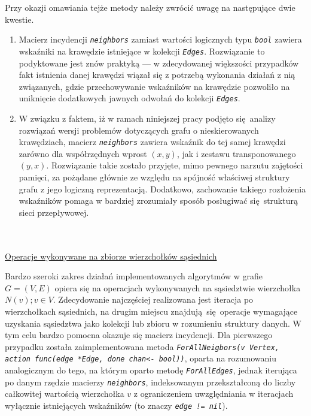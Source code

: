 {{      Przy okazji omawiania tejże metody należy zwrócić uwagę na następujące dwie kwestie.
      \begin{enumerate}
        \item Macierz incydencji \textit{\lstinline{neighbors}} zamiast wartości logicznych typu \textit{\lstinline{bool}} zawiera wskaźniki na krawędzie istniejące w kolekcji \textit{\lstinline{Edges}}.
        Rozwiązanie to podyktowane jest znów praktyką --- w zdecydowanej większości przypadków fakt istnienia danej krawędzi wiązał się z potrzebą wykonania działań z nią związanych, gdzie przechowywanie wskaźników na krawędzie pozwoliło na uniknięcie dodatkowych jawnych odwołań do kolekcji \textit{\lstinline{Edges}}.
        \item W związku z faktem, iż w ramach niniejszej pracy podjęto się analizy rozwiązań wersji problemów dotyczących grafu o nieskierowanych krawędziach, macierz \textit{\lstinline{neighbors}} zawiera wskaźnik do tej samej krawędzi zarówno dla współrzędnych wprost $(x, y)$, jak i zestawu transponowanego $(y, x)$.
        Rozwiązanie takie zostało przyjęte, mimo pewnego narzutu zajętości pamięci, za pożądane głównie ze względu na spójność właściwej struktury grafu z jego logiczną reprezentacją.
        Dodatkowo, zachowanie takiego rozłożenia wskaźników pomaga w bardziej zrozumiały sposób posługiwać się strukturą sieci przepływowej.
      \end{enumerate}
  }
  \\\\\underline{Operacje wykonywane na zbiorze wierzchołków sąsiednich}\\
  \par{
    Bardzo szeroki zakres działań implementowanych algorytmów w grafie $G=(V,E)$ opiera się na operacjach wykonywanych na sąsiedztwie wierzchołka $N(v); v \in V$.
    Zdecydowanie najczęściej realizowana jest iteracja po wierzchołkach sąsiednich, na drugim miejscu znajdują się operacje wymagające uzyskania sąsiedztwa jako kolekcji lub zbioru w rozumieniu struktury danych.
    W tym celu bardzo pomocna okazuje się macierz incydencji.
    Dla pierwszego przypadku została zaimplementowana metoda \textit{\lstinline{ForAllNeigbors(v Vertex, action func(edge *Edge, done chan<- bool))}}, oparta na rozumowaniu analogicznym do tego, na którym oparto metodę \textit{\lstinline{ForAllEdges}}, jednak iterująca po danym rzędzie macierzy \textit{\lstinline{neighbors}}, indeksowanym przekształconą do liczby całkowitej wartością wierzchołka $v$ z ograniczeniem uwzględniania w iteracjach wyłącznie istniejących wskaźników (to znaczy \textit{\lstinline{edge != nil}}).

}}
